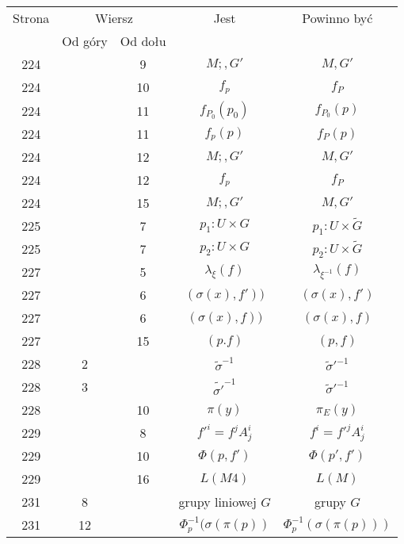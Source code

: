 \documentclass[a4paper,11pt]{article}
\begin{document}
\begin{center}
  \begin{tabular}{|c|c|c|c|c|}
    \hline
    Strona & \multicolumn{2}{c|}{Wiersz} & Jest
                              & Powinno być \\ \cline{2-3}
    & Od góry & Od dołu & & \\
    \hline
    224 & & \hphantom{0}9 & $M;, G'$ & $M, G'$ \\
    224 & & 10 & $f_{ p }$ & $f_{ P }$ \\
    224 & & 11 & $f_{ P_{ 0 } }( p_{ 0 } )$ & $f_{ P_{ 0 } }( p )$ \\
    224 & & 11 & $f_{ p }( p )$ & $f_{ P }( p )$ \\
    224 & & 12 & $M;, G'$ & $M, G'$ \\
    224 & & 12 & $f_{ p }$ & $f_{ P }$ \\
    224 & & 15 & $M;, G'$ & $M, G'$ \\
    225 & & \hphantom{0}7 & $p_{ 1 } : U \times G$
           & $p_{ 1 } : U \times \widetilde{ G }$ \\
    225 & & \hphantom{0}7 & $p_{ 2 } : U \times G$
    & $p_{ 2 } : U \times \widetilde{ G }$ \\
    227 & & \hphantom{0}5 & $\lambda_{ \xi }( f )$ & $\lambda_{ \xi^{ -1 } }( f )$ \\
    227 & & \hphantom{0}6 & $( \sigma( x ), f' ) )$ & $( \sigma( x ), f' )$ \\
    227 & & \hphantom{0}6 & $( \sigma( x ), f ) )$ & $( \sigma( x ), f )$ \\
    227 & & 15 & $( p. f )$ & $( p, f )$ \\
    228 & \hphantom{0}2 & & $\widetilde{ \sigma }^{ -1 }$
    & $\widetilde{ \sigma }'^{ -1 }$ \\
    228 & \hphantom{0}3 & & $\widetilde{ \sigma' }^{ -1 }$
    & $\widetilde{ \sigma }'^{ -1 }$ \\
    228 & & 10 & $\pi( y )$ & $\pi_{ E }( y )$ \\
    229 & & \hphantom{0}8 & $f'^{ i } = f^{ j } A^{ i }_{ j }$
           & $f^{ i } = f'^{ j } A^{ i }_{ j }$ \\
    229 & & 10 & $\Phi( p, f' )$ & $\Phi( p', f' )$ \\
    229 & & 16 & $L( M 4 )$ & $L( M )$ \\
    231 & \hphantom{0}8 & & grupy liniowej $G$ & grupy $G$ \\
    231 & 12 & & $\Phi^{ -1 }_{ p }( \sigma( \pi( p ) )$
           & $\Phi^{ -1 }_{ p }( \sigma( \pi( p ) ) )$ \\

\end{tabular}
\end{center}
\end{document}
